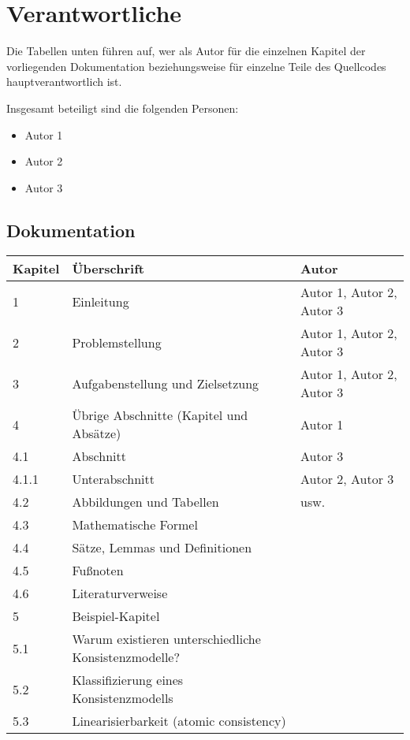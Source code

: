 \newpage

\section*{Verantwortliche}

Die Tabellen unten führen auf, wer als Autor für die einzelnen Kapitel der vorliegenden Dokumentation beziehungsweise für einzelne Teile des Quellcodes hauptverantwortlich ist.

Insgesamt beteiligt sind die folgenden Personen:

\begin{itemize}
	\item Autor 1
	\item Autor 2
	\item Autor 3
\end{itemize}

\subsection*{Dokumentation}

\begin{table}
	\begin{small}
	\begin{tabularx}{\textwidth}{|l|X|X|}
		\hline		
		\textbf{Kapitel} & \textbf{Überschrift} & \textbf{Autor}\\
		\hline
		1 & Einleitung & Autor 1, Autor 2, Autor 3\\
		\hline
		2 & Problemstellung & Autor 1, Autor 2, Autor 3\\
		\hline
		3 & Aufgabenstellung und Zielsetzung & Autor 1, Autor 2, Autor 3\\
		\hline
		4 & Übrige Abschnitte (Kapitel und Absätze) & Autor 1\\
		\hline
		4.1 & Abschnitt & Autor 3\\
		\hline
		4.1.1 & Unterabschnitt & Autor 2, Autor 3\\
		\hline
		4.2 & Abbildungen und Tabellen & usw.\\
		\hline
		4.3 & Mathematische Formel	&  \\
		\hline
		4.4 & Sätze, Lemmas und Definitionen &  \\
		\hline
		4.5 & Fußnoten & \\
		\hline
		4.6 & Literaturverweise & \\
		\hline
		5 & Beispiel-Kapitel & \\
		\hline
		5.1 & Warum existieren unterschiedliche Konsistenzmodelle? & \\
		\hline
		5.2 & Klassifizierung eines Konsistenzmodells	& \\
		\hline
		5.3 & Linearisierbarkeit (atomic consistency)	& \\
		\hline
	\end{tabularx}
	\end{small}
\end{table}

